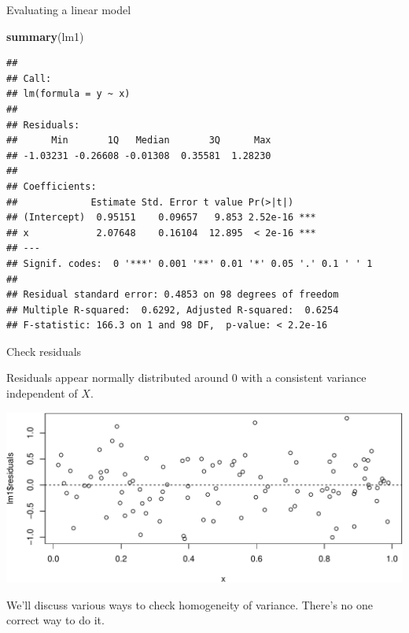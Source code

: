 \documentclass[
  ignorenonframetext,
]{beamer}
\newenvironment{Shaded}{\begin{snugshade}}{\end{snugshade}}
\newcommand{\DataTypeTok}[1]{\textcolor[rgb]{0.13,0.29,0.53}{#1}}
\newcommand{\DecValTok}[1]{\textcolor[rgb]{0.00,0.00,0.81}{#1}}
\newcommand{\KeywordTok}[1]{\textcolor[rgb]{0.13,0.29,0.53}{\textbf{#1}}}
\newcommand{\NormalTok}[1]{#1}
\newcommand{\OperatorTok}[1]{\textcolor[rgb]{0.81,0.36,0.00}{\textbf{#1}}}
\newcommand{\StringTok}[1]{\textcolor[rgb]{0.31,0.60,0.02}{#1}}
\begin{document}
\begin{frame}[fragile]{Evaluating a linear model}
\protect\hypertarget{evaluating-a-linear-model}{}

\scriptsize

\begin{Shaded}
\begin{Highlighting}[]
\KeywordTok{summary}\NormalTok{(lm1)}
\end{Highlighting}
\end{Shaded}

\begin{verbatim}
## 
## Call:
## lm(formula = y ~ x)
## 
## Residuals:
##      Min       1Q   Median       3Q      Max 
## -1.03231 -0.26608 -0.01308  0.35581  1.28230 
## 
## Coefficients:
##             Estimate Std. Error t value Pr(>|t|)    
## (Intercept)  0.95151    0.09657   9.853 2.52e-16 ***
## x            2.07648    0.16104  12.895  < 2e-16 ***
## ---
## Signif. codes:  0 '***' 0.001 '**' 0.01 '*' 0.05 '.' 0.1 ' ' 1
## 
## Residual standard error: 0.4853 on 98 degrees of freedom
## Multiple R-squared:  0.6292, Adjusted R-squared:  0.6254 
## F-statistic: 166.3 on 1 and 98 DF,  p-value: < 2.2e-16
\end{verbatim}

\end{frame}

\begin{frame}[fragile]{Check residuals}
\protect\hypertarget{check-residuals}{}

Residuals appear normally distributed around 0 with a consistent
variance independent of \(X\). \scriptsize

\begin{Shaded}
\end{Shaded}

\includegraphics{Regression_and_ANOVA_files/figure-beamer/unnamed-chunk-5-1.pdf}

\normalsize

We'll discuss various ways to check homogeneity of variance. There's no
one correct way to do it.

\end{frame}
\end{document}
